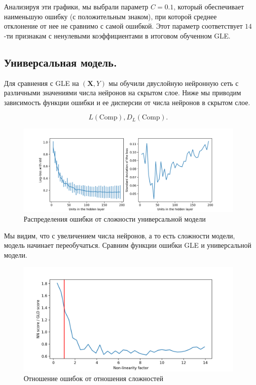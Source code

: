 \documentclass[12pt, fleqn, unicode]{article}
\newcommand{\bX}{\mathbf{X}}
\begin{document}
Анализируя эти графики, мы выбрали параметр $C=0.1$, который обеспечивает
наименьшую ошибку (с положительным знаком), при которой среднее отклонение
от нее не сравнимо с самой ошибкой. Этот параметр соответствует
$14$-ти признакам с ненулевыми коэффициентами в итоговом обученном GLE.

\subsection{Универсальная модель.}

Для сравнения с GLE на $(\bX, Y)$ мы обучили двуслойную нейронную сеть с различными
значениями числа нейронов на скрытом слое. Ниже мы приводим зависимость
функции ошибки и ее дисперсии от числа нейронов в скрытом слое.

$$
        L(\mathrm{Comp}), D_L(\mathrm{Comp}).
$$

\begin{figure}[ht]
    \caption{Распределения ошибки от сложности универсальной модели}
    \centering
      \includegraphics[width=\textwidth]{../pics/loss_and_std_of_n_units_reg.png}
\end{figure}

Мы видим, что с увеличением числа нейронов, а то есть сложности модели, модель
начинает переобучаться. Сравним функции ошибки GLE и универсальной модели.

\begin{figure}[ht]
    \caption{Отношение ошибок от отношения сложностей}
    \centering
      \includegraphics[width=\textwidth]{../pics/loss_and_std_of_nl_factor.png}
\end{figure}
\end{document}
